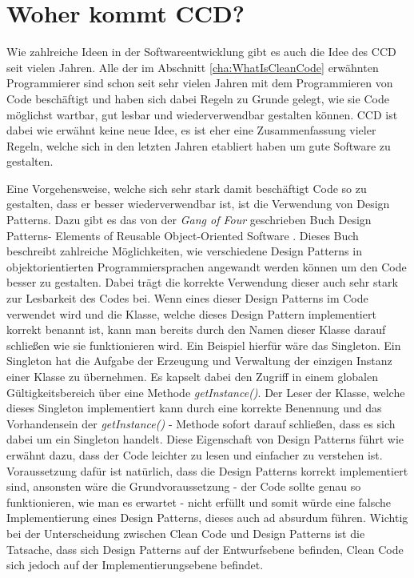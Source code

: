 \section{Woher kommt CCD?}
Wie zahlreiche Ideen in der Softwareentwicklung gibt es auch die Idee des CCD seit vielen Jahren. Alle der im Abschnitt \ref{cha:WhatIsCleanCode} erwähnten Programmierer sind schon seit sehr vielen Jahren mit dem Programmieren von Code beschäftigt und haben sich dabei Regeln zu Grunde gelegt, wie sie Code möglichst wartbar, gut lesbar und wiederverwendbar gestalten können. CCD ist dabei wie erwähnt keine neue Idee, es ist eher eine Zusammenfassung vieler Regeln, welche sich in den letzten Jahren etabliert haben um gute Software zu gestalten.

\SuperPar Eine Vorgehensweise, welche sich sehr stark damit beschäftigt Code so zu gestalten, dass er besser wiederverwendbar ist, ist die Verwendung von Design Patterns. Dazu gibt es das von der \textit{Gang of Four} geschrieben Buch Design Patterns- Elements of Reusable Object-Oriented Software \cite{Gamma1995}. Dieses Buch beschreibt zahlreiche Möglichkeiten, wie verschiedene Design Patterns in objektorientierten Programmiersprachen angewandt werden können um den Code besser zu gestalten. Dabei trägt die korrekte Verwendung dieser auch sehr stark zur Lesbarkeit des Codes bei. Wenn eines dieser Design Patterns im Code verwendet wird und die Klasse, welche dieses Design Pattern implementiert korrekt benannt ist, kann man bereits durch den Namen dieser Klasse darauf schließen wie sie funktionieren wird. Ein Beispiel hierfür wäre das Singleton. Ein Singleton hat die Aufgabe der Erzeugung und Verwaltung der einzigen Instanz einer Klasse zu übernehmen. Es kapselt dabei den Zugriff in einem globalen Gültigkeitsbereich über eine Methode \textit{getInstance()}. Der Leser der Klasse, welche dieses Singleton implementiert kann durch eine korrekte Benennung und das Vorhandensein der \textit{getInstance()} - Methode sofort darauf schließen, dass es sich dabei um ein Singleton handelt. Diese Eigenschaft von Design Patterns führt wie erwähnt dazu, dass der Code leichter zu lesen und einfacher zu verstehen ist. Voraussetzung dafür ist natürlich, dass die Design Patterns korrekt implementiert sind, ansonsten wäre die Grundvoraussetzung - der Code sollte genau so funktionieren, wie man es erwartet - nicht erfüllt und somit würde eine falsche Implementierung eines Design Patterns, dieses auch ad absurdum führen. Wichtig bei der Unterscheidung zwischen Clean Code und Design Patterns ist die Tatsache, dass sich Design Patterns auf der Entwurfsebene befinden, Clean Code sich jedoch auf der Implementierungsebene befindet.

